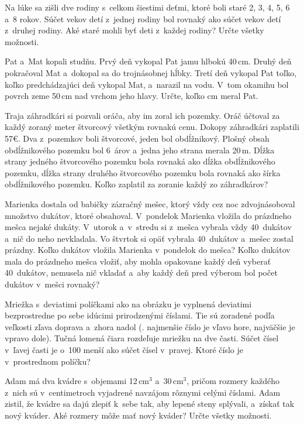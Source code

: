 {%
Na lúke sa zišli dve rodiny s~celkom šiestimi deťmi,
ktoré boli staré 2, 3, 4, 5, 6 a~8 rokov.
Súčet vekov detí z~jednej rodiny bol rovnaký ako súčet vekov detí z~druhej rodiny.
Aké staré mohli byť deti z~každej rodiny?
Určte všetky možnosti.
}

{%
Pat a~Mat kopali studňu.
Prvý deň vykopal Pat jamu hlbokú 40\,cm.
Druhý deň pokračoval Mat a~dokopal sa do trojnásobnej hĺbky.
Tretí deň vykopal Pat toľko, koľko predchádzajúci deň vykopal Mat, a~narazil na vodu.
V~tom okamihu bol povrch zeme 50\,cm nad vrchom jeho hlavy.
Určte, koľko cm meral Pat.}

{%
Traja záhradkári si pozvali oráča, aby im zoral ich pozemky.
Oráč účtoval za každý zoraný meter štvorcový všetkým rovnakú cenu.
Dokopy záhradkári zaplatili 57€. Dva z~pozemkov boli štvorcové, jeden bol obdĺžnikový.
Plošný obsah obdĺžnikového pozemku bol 6~árov a~jedna jeho strana merala 20\,m.
Dĺžka strany jedného štvorcového pozemku bola rovnaká ako dĺžka obdĺžnikového pozemku, dĺžka strany druhého štvorcového pozemku bola rovnaká ako šírka obdĺžnikového pozemku.
Koľko zaplatil za zoranie každý zo záhradkárov?}

{%
Marienka dostala od babičky zázračný mešec,
ktorý vždy cez noc zdvojnásoboval množstvo dukátov, ktoré obsahoval.
V~pondelok Marienka vložila do prázdneho mešca nejaké dukáty.
V~utorok a~v~stredu si z~mešca vybrala vždy 40~dukátov a~nič do neho nevkladala.
Vo štvrtok si opäť vybrala 40~dukátov a~mešec zostal prázdny.
Koľko dukátov vložila Marienka v~pondelok do mešca?
Koľko dukátov mala do prázdneho mešca vložiť, aby mohla opakovane každý deň vyberať 40~dukátov,
nemusela nič vkladať a~aby každý deň pred výberom bol počet dukátov v~mešci rovnaký?
}

{%
Mriežka s~deviatimi políčkami ako na obrázku je vyplnená deviatimi bezprostredne po sebe idúcimi prirodzenými číslami.
Tie sú zoradené podľa veľkosti zľava doprava a~zhora nadol (\tj. najmenšie číslo je vľavo hore, najväčšie je vpravo dole).
Tučná lomená čiara rozdeľuje mriežku na dve časti. Súčet čísel v~ľavej časti je o~100 menší ako súčet čísel v~pravej.
Ktoré číslo je v~prostrednom políčku?
\ifobrazkyvedla\else{}\fi
}

{%
Adam má dva kvádre s~objemami 12\,cm$^3$ a~30\,cm$^3$, pričom rozmery každého z~nich sú v~centimetroch vyjadrené navzájom rôznymi celými číslami.
Adam zistil, že kvádre sa dajú zlepiť k~sebe tak, aby lepené steny splývali, a~získať tak nový kváder.
Aké rozmery môže mať nový kváder? Určte všetky možnosti.}

